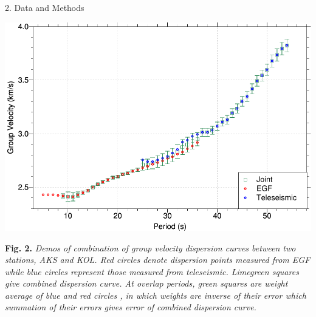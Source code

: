 \documentclass[
    landscape,      %
    paperwidth = 1200mm,
    paperheight = 900mm,
    fontscale = 0.34,
    margin = 1.7cm,
]{baposter}
\begin{document}
\begin{poster}
\begin{posterbox}[column=0, below=auto]{2. Data and Methods}
\begin{center}
\begin{minipage}{0.6\textwidth}
\includegraphics[width=\textwidth]{JointDisp}
\end{minipage}
\hspace{0.1cm}
\begin{minipage}{0.35\textwidth}
\footnotesize
\textbf{Fig. 2.}
\itshape
Demos of combination of group velocity dispersion curves between two stations, AKS and KOL.
Red circles denote dispersion points measured from EGF while blue circles represent those measured from teleseismic.
Limegreen squares give combined dispersion curve. At overlap periods, green squares are weight average of blue and red circles
, in which weights are inverse of their error which summation of their errors gives error of combined dispersion curve.
\end{minipage}
\end{center}


\end{posterbox}


\end{poster}
\end{document}
